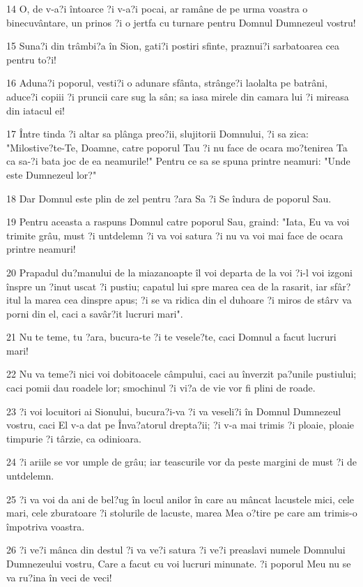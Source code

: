 \par 14 O, de v-a?i întoarce ?i v-a?i pocai, ar ramâne de pe urma voastra o binecuvântare, un prinos ?i o jertfa cu turnare pentru Domnul Dumnezeul vostru!
\par 15 Suna?i din trâmbi?a în Sion, gati?i postiri sfinte, praznui?i sarbatoarea cea pentru to?i!
\par 16 Aduna?i poporul, vesti?i o adunare sfânta, strânge?i laolalta pe batrâni, aduce?i copiii ?i pruncii care sug la sân; sa iasa mirele din camara lui ?i mireasa din iatacul ei!
\par 17 Între tinda ?i altar sa plânga preo?ii, slujitorii Domnului, ?i sa zica: "Milostive?te-Te, Doamne, catre poporul Tau ?i nu face de ocara mo?tenirea Ta ca sa-?i bata joc de ea neamurile!" Pentru ce sa se spuna printre neamuri: "Unde este Dumnezeul lor?"
\par 18 Dar Domnul este plin de zel pentru ?ara Sa ?i Se îndura de poporul Sau.
\par 19 Pentru aceasta a raspuns Domnul catre poporul Sau, graind: "Iata, Eu va voi trimite grâu, must ?i untdelemn ?i va voi satura ?i nu va voi mai face de ocara printre neamuri!
\par 20 Prapadul du?manului de la miazanoapte îl voi departa de la voi ?i-l voi izgoni înspre un ?inut uscat ?i pustiu; capatul lui spre marea cea de la rasarit, iar sfâr?itul la marea cea dinspre apus; ?i se va ridica din el duhoare ?i miros de stârv va porni din el, caci a savâr?it lucruri mari".
\par 21 Nu te teme, tu ?ara, bucura-te ?i te vesele?te, caci Domnul a facut lucruri mari!
\par 22 Nu va teme?i nici voi dobitoacele câmpului, caci au înverzit pa?unile pustiului; caci pomii dau roadele lor; smochinul ?i vi?a de vie vor fi plini de roade.
\par 23 ?i voi locuitori ai Sionului, bucura?i-va ?i va veseli?i în Domnul Dumnezeul vostru, caci El v-a dat pe Înva?atorul drepta?ii; ?i v-a mai trimis ?i ploaie, ploaie timpurie ?i târzie, ca odinioara.
\par 24 ?i ariile se vor umple de grâu; iar teascurile vor da peste margini de must ?i de untdelemn.
\par 25 ?i va voi da ani de bel?ug în locul anilor în care au mâncat lacustele mici, cele mari, cele zburatoare ?i stolurile de lacuste, marea Mea o?tire pe care am trimis-o împotriva voastra.
\par 26 ?i ve?i mânca din destul ?i va ve?i satura ?i ve?i preaslavi numele Domnului Dumnezeului vostru, Care a facut cu voi lucruri minunate. ?i poporul Meu nu se va ru?ina în veci de veci!
